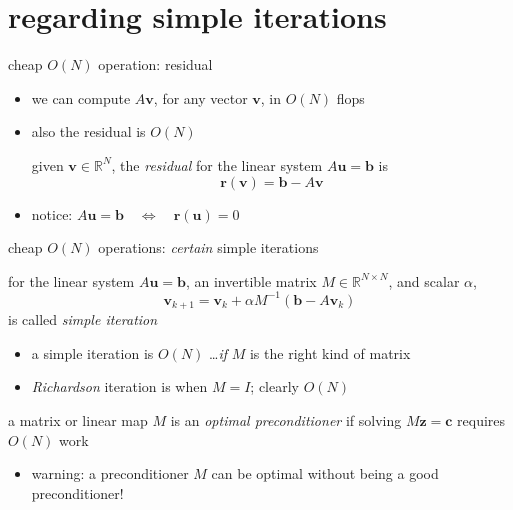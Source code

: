 \documentclass[10pt,
               svgnames,
               hyperref={colorlinks,citecolor=DeepPink4,linkcolor=FireBrick,urlcolor=Maroon},
               usepdftitle=false]{beamer}
\newcommand{\bb}{\mathbf{b}}
\newcommand{\bc}{\mathbf{c}}
\newcommand{\br}{\mathbf{r}}
\newcommand{\bu}{\mathbf{u}}
\newcommand{\bv}{\mathbf{v}}
\newcommand{\bz}{\mathbf{z}}
\newcommand{\RR}{\mathbb{R}}
\begin{document}
\section{regarding simple iterations}

\begin{frame}{cheap $O(N)$ operation: residual}
\begin{itemize}
\item we can compute $A\bv$, for any vector $\bv$, in $O(N)$ flops
\item also the residual is $O(N)$

\begin{definition} given $\bv \in\RR^N$, the \emph{residual} for the linear system $A\bu=\bb$ is
	$$\br(\bv) = \bb - A\bv$$
\end{definition}

\item notice: $A\bu = \bb \quad \iff \quad \br(\bu) = 0$
\end{itemize}
\end{frame}


\begin{frame}{cheap $O(N)$ operations: \emph{certain} simple iterations}

\begin{definition} for the linear system $A\bu=\bb$, an invertible matrix $M\in \RR^{N\times N}$, and scalar $\alpha$,
    $$\bv_{k+1} = \bv_k + \alpha M^{-1} \left(\bb - A \bv_k\right)$$
is called \emph{simple iteration}
\end{definition}

\bigskip
\begin{itemize}
\item a simple iteration is $O(N)$ \dots \emph{if} $M$ is the right kind of matrix
\item \emph{Richardson} iteration is when $M=I$; clearly $O(N)$
\end{itemize}

\bigskip
\begin{definition} a matrix or linear map $M$ is an \emph{optimal preconditioner} if solving $M\bz=\bc$ requires $O(N)$ work
\end{definition}

\bigskip
\begin{itemize}
\item warning: a preconditioner $M$ can be optimal without being a good preconditioner!
\end{itemize}
\end{frame}
\end{document}
